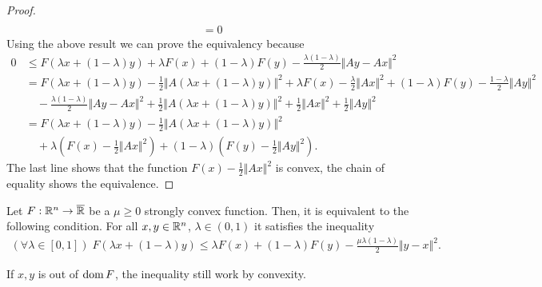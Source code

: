 \documentclass[12pt]{article}
\begin{document}
\begin{proof}
\begin{align*}
                \\
                &= 0
            \end{align*}
            Using the above result we can prove the equivalency because 
            {\small
            \begin{align*}
                0 &\le F(\lambda x + (1 - \lambda)y) + \lambda F(x) + (1 - \lambda)F(y) -\frac{\lambda(1 - \lambda)}{2} \Vert Ay - Ax\Vert^2
                \\
                &=  F(\lambda x + (1 - \lambda)y) - \frac{1}{2}\Vert A(\lambda x + (1 - \lambda)y)\Vert^2 
                + \lambda F(x) - \frac{\lambda}{2}\Vert Ax\Vert^2 
                + (1 - \lambda)F(y) - \frac{1 - \lambda}{2} \Vert Ay\Vert^2 
                    \\ &\quad 
                    - \frac{\lambda(1 - \lambda)}{2} \Vert Ay - Ax\Vert^2 + \frac{1}{2}\Vert A(\lambda x + (1 - \lambda)y)\Vert^2
                    + \frac{1}{2}\Vert Ax\Vert^2 + \frac{1}{2}\Vert Ay\Vert^2 
                \\
                &= 
                F(\lambda x + (1 - \lambda)y) - \frac{1}{2}\Vert A(\lambda x + (1 - \lambda)y)\Vert^2 
                    \\ &\quad 
                    + \lambda \left(F(x) - \frac{1}{2}\Vert Ax\Vert^2\right) 
                    + (1 - \lambda)\left(F(y) - \frac{1}{2} \Vert Ay\Vert^2\right). 
            \end{align*}
            }
            The last line shows that the function $F(x) - \frac{1}{2}\Vert Ax\Vert^2$ is convex, the chain of equality shows the equivalence. 
        \end{proof}
        \begin{theorem}\label{thm:jesen}
            Let $F: \mathbb R^n \rightarrow \overline {\mathbb R}$ be a $\mu \ge 0$ strongly convex function. 
            Then, it is equivalent to the following condition. 
            For all $x, y \in \mathbb R^n$, $\lambda \in (0, 1)$ it satisfies the inequality 
            \begin{align*}
                (\forall \lambda \in [0, 1])\; 
                F(\lambda x + (1 - \lambda)y) \le \lambda F(x) + (1 - \lambda)F(y) -\frac{\mu\lambda(1 - \lambda)}{2} \Vert y - x\Vert^2. 
            \end{align*}
        \end{theorem}
        \begin{remark}
            If $x, y$ is out of $\operatorname{dom} F$, the inequality still work by convexity. 
        \end{remark}
\end{document}
